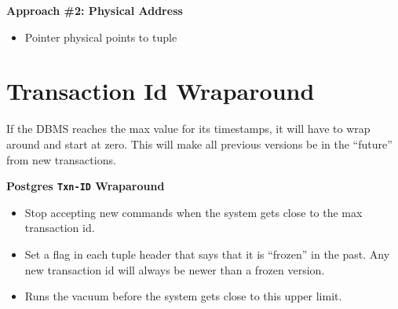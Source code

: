 \documentclass[11pt]{article}
\begin{document}
\textbf{Approach \#2: Physical Address}
\begin{itemize}
    \item Pointer physical points to tuple
\end{itemize}

\section{Transaction Id Wraparound}
If the DBMS reaches the max value for its timestamps, it will have to wrap around and 
start at zero. This will make all previous versions be in the ``future'' from new transactions.

\textbf{Postgres \texttt{Txn-ID} Wraparound}
\begin{itemize}
    \item
    Stop accepting new commands when the system gets close to the max transaction id.
        
    \item
    Set a flag in each tuple header that says that it is ``frozen'' in the past. Any new 
    transaction id will always be newer than a frozen version.
        
    \item
    Runs the vacuum before the system gets close to this upper limit.
\end{itemize}

\newpage


\end{document}
